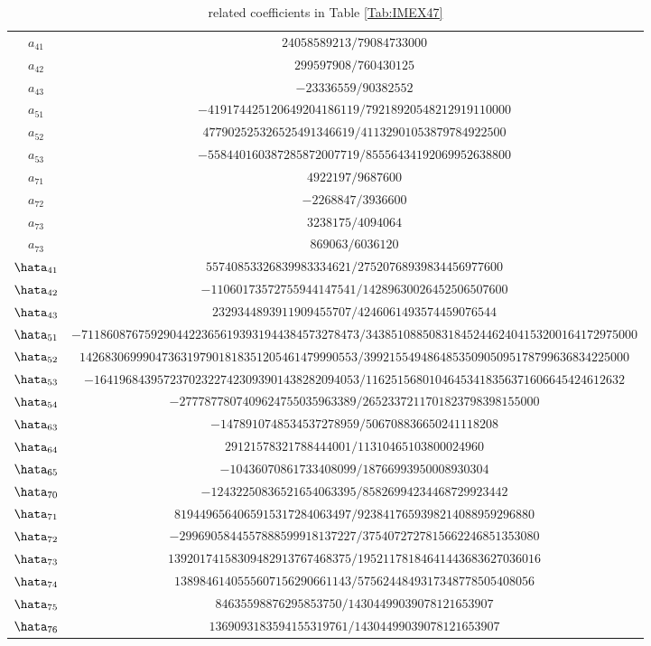  \begin{table}[h] \label{Tab:coef}
    \centering
    \begin{tabular}[h]{|c|c|}
\hline
$a_{41}$ & $24058589213/79084733000$ \\
$a_{42}$ & $299597908/760430125$ \\
$a_{43}$ & $-23336559/90382552$ \\ \hline
$a_{51}$ & $-419174425120649204186119/79218920548212919110000$ \\
$a_{52}$ & $477902525326525491346619/41132901053879784922500$ \\
$a_{53}$ & $-558440160387285872007719/85556434192069952638800$ \\ \hline
$a_{71}$ & $4922197/9687600$ \\
$a_{72}$ & $-2268847/3936600$ \\
$a_{73}$ & $3238175/4094064$ \\
$a_{73}$ & $869063/6036120$ \\\hline
$\hata_{41}$ & $55740853326839983334621/27520768939834456977600$ \\
$\hata_{42}$ & $-11060173572755944147541/14289630026452506507600$ \\
$\hata_{43}$ & $2329344893911909455707/4246061493574459076544$ \\ \hline
$\hata_{51}$ & \scriptsize $-71186087675929044223656193931944384573278473/3438510885083184524462404153200164172975000$ \\
$\hata_{52}$ & \scriptsize $14268306999047363197901818351205461479990553/399215549486485350905095178799636834225000$ \\
$\hata_{53}$ & \scriptsize $-164196843957237023227423093901438282094053/11625156801046453418356371606645424612632$ \\
$\hata_{54}$ &  $-2777877807409624755035963389/2652337211701823798398155000$ \\ \hline
$\hata_{63}$ &  $-1478910748534537278959/506708836650241118208$ \\
$\hata_{64}$ &  $29121578321788444001/11310465103800024960$ \\
$\hata_{65}$ &  $-10436070861733408099/18766993950008930304$ \\ \hline
$\hata_{70}$ &  $-12432250836521654063395/85826994234468729923442$ \\
$\hata_{71}$ &  $8194496564065915317284063497/9238417659398214088959296880$ \\
$\hata_{72}$ &  $-2996905844557888599918137227/3754072727815662246851353080$ \\
$\hata_{73}$ &  $13920174158309482913767468375/19521178184641443683627036016$ \\
$\hata_{74}$ &  $1389846140555607156290661143/5756244849317348778505408056$ \\ 
$\hata_{75}$ &  $84635598876295853750/14304499039078121653907$ \\ 
$\hata_{76}$ &  $1369093183594155319761/14304499039078121653907$ \\ \hline
\end{tabular}
    \caption{related coefficients in Table \ref{Tab:IMEX47}}
\end{table}

